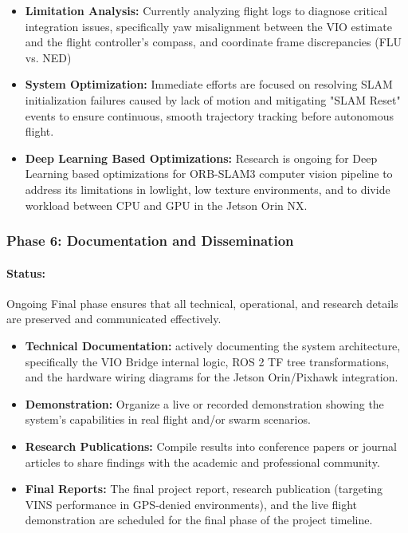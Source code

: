\begin{itemize}
    \item \textbf{Limitation Analysis:}  Currently analyzing flight logs to diagnose critical integration issues, specifically yaw misalignment between the VIO estimate and the flight controller's compass, and coordinate frame discrepancies (FLU vs. NED)
    \item \textbf{System Optimization:} Immediate efforts are focused on resolving SLAM initialization failures caused by lack of motion and mitigating "SLAM Reset" events to ensure continuous, smooth trajectory tracking before autonomous flight.
    \item \textbf{Deep Learning Based Optimizations:} Research is ongoing for Deep Learning based optimizations for ORB-SLAM3 computer vision pipeline to address its limitations in lowlight, low texture environments, and to divide workload between CPU and GPU in the Jetson Orin NX.
\end{itemize}

\subsubsection{Phase 6: Documentation and Dissemination}
\paragraph{Status:}Ongoing
Final phase ensures that all technical, operational, and research details are preserved and communicated effectively.

\begin{itemize}
    \item \textbf{Technical Documentation:}  actively documenting the system architecture, specifically the VIO Bridge internal logic, ROS 2 TF tree transformations, and the hardware wiring diagrams for the Jetson Orin/Pixhawk integration.
    \item \textbf{Demonstration:} Organize a live or recorded demonstration showing the system’s capabilities in real flight and/or swarm scenarios.
    \item \textbf{Research Publications:} Compile results into conference papers or journal articles to share findings with the academic and professional community.
    \item \textbf{Final Reports:} The final project report, research publication (targeting VINS performance in GPS-denied environments), and the live flight demonstration are scheduled for the final phase of the project timeline.
\end{itemize}

